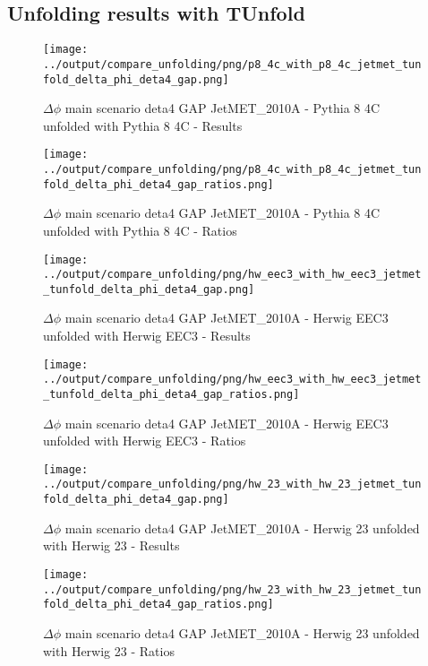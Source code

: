 \documentclass[11pt]{book}
\begin{document}
\clearpage
\subsection{Unfolding results with TUnfold}

\begin{figure}[ht]
\centering
\texttt{[image: ../output/compare\_unfolding/png/p8\_4c\_with\_p8\_4c\_jetmet\_tunfold\_delta\_phi\_deta4\_gap.png]}
\caption{$\Delta\phi$ main scenario deta4 GAP JetMET\_2010A - Pythia 8 4C unfolded with Pythia 8 4C - Results}
\label{p8_p8_jetmet_tunfold_delta_phi_deta4_gap_a}
\end{figure}

\begin{figure}[ht]
\centering
\texttt{[image: ../output/compare\_unfolding/png/p8\_4c\_with\_p8\_4c\_jetmet\_tunfold\_delta\_phi\_deta4\_gap\_ratios.png]}
\caption{$\Delta\phi$ main scenario deta4 GAP JetMET\_2010A - Pythia 8 4C unfolded with Pythia 8 4C - Ratios}
\label{p8_p8_jetmet_tunfold_delta_phi_deta4_gap_b}
\end{figure}

\begin{figure}[ht]
\centering
\texttt{[image: ../output/compare\_unfolding/png/hw\_eec3\_with\_hw\_eec3\_jetmet\_tunfold\_delta\_phi\_deta4\_gap.png]}
\caption{$\Delta\phi$ main scenario deta4 GAP JetMET\_2010A - Herwig EEC3 unfolded with Herwig EEC3 - Results}
\label{hw_eec3_hw_eec3_jetmet_tunfold_delta_phi_deta4_gap_a}
\end{figure}

\begin{figure}[ht]
\centering
\texttt{[image: ../output/compare\_unfolding/png/hw\_eec3\_with\_hw\_eec3\_jetmet\_tunfold\_delta\_phi\_deta4\_gap\_ratios.png]}
\caption{$\Delta\phi$ main scenario deta4 GAP JetMET\_2010A - Herwig EEC3 unfolded with Herwig EEC3 - Ratios}
\label{hw_eec3_hw_eec3_jetmet_tunfold_delta_phi_deta4_gap_b}
\end{figure}

\begin{figure}[ht]
\centering
\texttt{[image: ../output/compare\_unfolding/png/hw\_23\_with\_hw\_23\_jetmet\_tunfold\_delta\_phi\_deta4\_gap.png]}
\caption{$\Delta\phi$ main scenario deta4 GAP JetMET\_2010A - Herwig 23 unfolded with Herwig 23 - Results}
\label{hw_23_hw_23_jetmet_tunfold_delta_phi_deta4_gap_a}
\end{figure}

\begin{figure}[ht]
\centering
\texttt{[image: ../output/compare\_unfolding/png/hw\_23\_with\_hw\_23\_jetmet\_tunfold\_delta\_phi\_deta4\_gap\_ratios.png]}
\caption{$\Delta\phi$ main scenario deta4 GAP JetMET\_2010A - Herwig 23 unfolded with Herwig 23 - Ratios}
\label{hw_23_hw_23_jetmet_tunfold_delta_phi_deta4_gap_b}
\end{figure}
\end{document}
